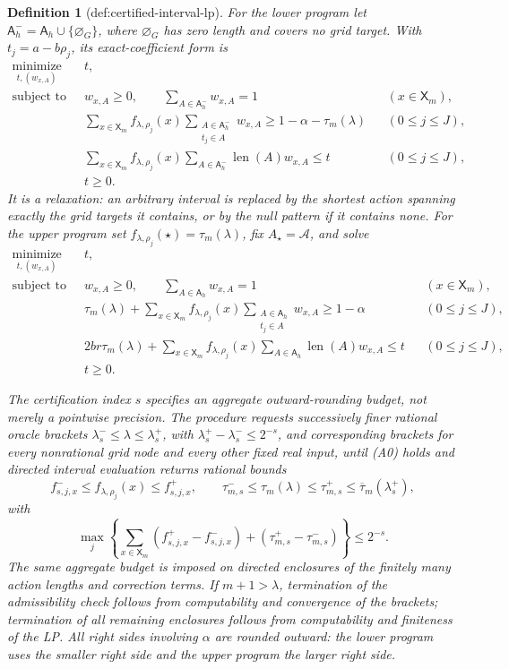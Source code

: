 \documentclass{article}
\newtheorem{definition}{Definition}
\begin{document}
\begin{definition}[def:certified-interval-lp]
For the lower program let
\(\mathsf A_h^-=\mathsf A_h\cup\{\varnothing_G\}\), where
\(\varnothing_G\) has zero length and covers no grid target.  With
\(t_j=a-b\rho_j\), its exact-coefficient form is
\[
 \begin{aligned}
 \operatorname*{minimize}_{t,(w_{x,A})}\quad &t,\\
 \text{subject to}\quad&
 w_{x,A}\ge0,\qquad \sum_{A\in\mathsf A_h^-}w_{x,A}=1
 &&(x\in\mathsf X_m),\\
 &\sum_{x\in\mathsf X_m} f_{\lambda,\rho_j}(x)
   \sum_{\substack{A\in\mathsf A_h^-\\t_j\in A}}w_{x,A}
   \ge1-\alpha-\tau_m(\lambda)
 &&(0\le j\le J),\\
 &\sum_{x\in\mathsf X_m} f_{\lambda,\rho_j}(x)
   \sum_{A\in\mathsf A_h^-}\operatorname{len}(A)w_{x,A}
   \le t
 &&(0\le j\le J),\\
 &t\ge0.
 \end{aligned}
 \tag{L}
\]
It is a relaxation: an arbitrary interval is replaced by the shortest
action spanning exactly the grid targets it contains, or by the null
pattern if it contains none.  For the upper program set
\(f_{\lambda,\rho_j}(\star)=\tau_m(\lambda)\), fix
\(A_\star=\mathcal A\), and solve
\[
 \begin{aligned}
 \operatorname*{minimize}_{t,(w_{x,A})}\quad &t,\\
 \text{subject to}\quad&
 w_{x,A}\ge0,\qquad \sum_{A\in\mathsf A_h}w_{x,A}=1
 &&(x\in\mathsf X_m),\\
 &\tau_m(\lambda)+\sum_{x\in\mathsf X_m} f_{\lambda,\rho_j}(x)
   \sum_{\substack{A\in\mathsf A_h\\t_j\in A}}w_{x,A}
   \ge1-\alpha
 &&(0\le j\le J),\\
 &2br\tau_m(\lambda)+\sum_{x\in\mathsf X_m} f_{\lambda,\rho_j}(x)
   \sum_{A\in\mathsf A_h}\operatorname{len}(A)w_{x,A}
   \le t
 &&(0\le j\le J),\\
 &t\ge0.
 \end{aligned}
 \tag{U}
\]

The certification index \(s\) specifies an aggregate outward-rounding
budget, not merely a pointwise precision.  The procedure requests
successively finer rational oracle brackets
\(\lambda_s^-\le\lambda\le\lambda_s^+\), with
\(\lambda_s^+-\lambda_s^-\le2^{-s}\), and corresponding brackets for
every nonrational grid node and every other fixed real input, until
(A0) holds and directed interval evaluation returns rational bounds
\[
 f_{s,j,x}^-\le f_{\lambda,\rho_j}(x)\le f_{s,j,x}^+,
 \qquad
 \tau_{m,s}^-\le\tau_m(\lambda)\le\tau_{m,s}^+
 \le\overline\tau_m(\lambda_s^+),
\]
with
\[
 \max_j\left\{
 \sum_{x\in\mathsf X_m}(f_{s,j,x}^+-f_{s,j,x}^-)
 +(\tau_{m,s}^+-\tau_{m,s}^-)
 \right\}\le2^{-s}.
 \tag{A2}
\]
The same aggregate budget is imposed on directed enclosures of the
finitely many action lengths and correction terms.  If
\(m+1>\lambda\), termination of the admissibility check follows from
computability and convergence of the brackets; termination of all
remaining enclosures follows from computability and finiteness of the
LP.  All right sides involving \(\alpha\) are rounded outward: the
lower program uses the smaller right side and the upper program the
larger right side.


\end{definition}
\end{document}
